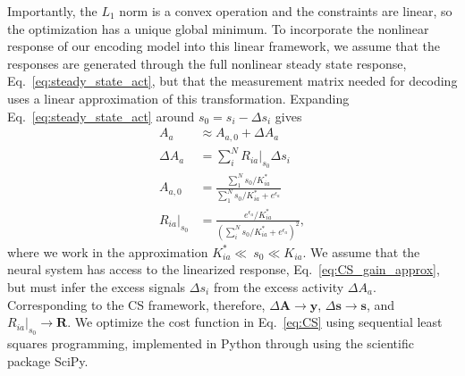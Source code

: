 Importantly, the $L_1$ norm is a convex operation and the constraints are linear, so the optimization has a unique global minimum. To incorporate the nonlinear response of our encoding model into this linear framework, we assume that the responses are generated through the full nonlinear steady state response, Eq.~\ref{eq:steady_state_act}, but that the measurement matrix needed for decoding uses a linear approximation of this transformation.  Expanding Eq.~\ref{eq:steady_state_act} around $s_0 = s_i - \Delta s_i$ gives
\begin{align}
A_a &\approx A_{a, 0} + \Delta A_a \label{eq:CS_act_approx} \\
\Delta A_a &= \sum_i^NR_{ia}\big|_{s_0}\Delta s_i \label{eq:CS_dAct_approx}\\
A_{a, 0} &= \frac{\sum_1^N s_0/K_{ia}^*}{\sum_1^N s_0/K_{ia}^* + e^{\epsilon_a}} \label{eq:CS_act0_approx} \\
R_{ia}\big|_{s_0} &=  \frac{e^{\epsilon_a}/K_{ia}^*}{(\sum_i^Ns_0/K_{ia}^* + e^{\epsilon_a})^2},
\label{eq:CS_gain_approx}
\end{align}
where we work in the approximation $K^*_{ia} \ll~s_0 \ll K_{ia}$. We assume that the neural system has access to the linearized response, Eq.~\ref{eq:CS_gain_approx}, but must infer the excess signals $\Delta s_i$ from the excess activity $\Delta A_a$. Corresponding to the CS framework, therefore, $\Delta \mathbf {A} \rightarrow \mathbf y$, $\Delta \mathbf s \rightarrow \mathbf s$, and $R_{ia}\big|_{s_0} \rightarrow \mathbf R$. We optimize the cost function in Eq.~\ref{eq:CS} using sequential least squares programming, implemented in Python through using the scientific package SciPy.

